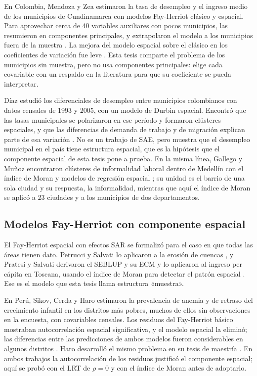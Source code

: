 En Colombia, Mendoza y Zea estimaron la tasa de desempleo y el ingreso medio de los municipios de Cundinamarca con modelos Fay-Herriot clásico y espacial. Para aprovechar cerca de 40 variables auxiliares con pocos municipios, las resumieron en componentes principales, y extrapolaron el modelo a los municipios fuera de la muestra \cite[pp.~1, 9]{MendozaZea2019}. La mejora del modelo espacial sobre el clásico en los coeficientes de variación fue leve \cite[p.~13]{MendozaZea2019}. Esta tesis comparte el problema de los municipios sin muestra, pero no usa componentes principales: elige cada covariable con un respaldo en la literatura para que su coeficiente se pueda interpretar.

Díaz estudió los diferenciales de desempleo entre municipios colombianos con datos censales de 1993 y 2005, con un modelo de Durbin espacial. Encontró que las tasas municipales se polarizaron en ese período y formaron clústeres espaciales, y que las diferencias de demanda de trabajo y de migración explican parte de esa variación \cite[pp.~123--124, 162]{Diaz2016}. No es un trabajo de SAE, pero muestra que el desempleo municipal en el país tiene estructura espacial, que es la hipótesis que el componente espacial de esta tesis pone a prueba. En la misma línea, Gallego y Muñoz encontraron clústeres de informalidad laboral dentro de Medellín con el índice de Moran y modelos de regresión espacial \cite[pp.~2, 20]{GallegoMunoz2017}; su unidad es el barrio de una sola ciudad y su respuesta, la informalidad, mientras que aquí el índice de Moran se aplicó a 23 ciudades y a los municipios de dos departamentos.

\subsection{Modelos Fay-Herriot con componente espacial}

El Fay-Herriot espacial con efectos SAR se formalizó para el caso en que todas las áreas tienen dato. Petrucci y Salvati lo aplicaron a la erosión de cuencas \cite{PetrucciSalvati2006}, y Pratesi y Salvati derivaron el SEBLUP y su ECM y lo aplicaron al ingreso per cápita en Toscana, usando el índice de Moran para detectar el patrón espacial \cite[pp.~114, 130]{PratesiSalvati2008}. Ese es el modelo que esta tesis llama estructura «muestra».

En Perú, Sikov, Cerda y Haro estimaron la prevalencia de anemia y de retraso del crecimiento infantil en los distritos más pobres, muchos de ellos sin observaciones en la encuesta, con covariables censales. Los residuos del Fay-Herriot básico mostraban autocorrelación espacial significativa, y el modelo espacial la eliminó; las diferencias entre las predicciones de ambos modelos fueron considerables en algunos distritos \cite[pp.~172, 194]{Sikov2023}. Haro desarrolló el mismo problema en su tesis de maestría \cite{Haro2022}. En ambos trabajos la autocorrelación de los residuos justificó el componente espacial; aquí se probó con el LRT de $\rho = 0$ y con el índice de Moran antes de adoptarlo.

